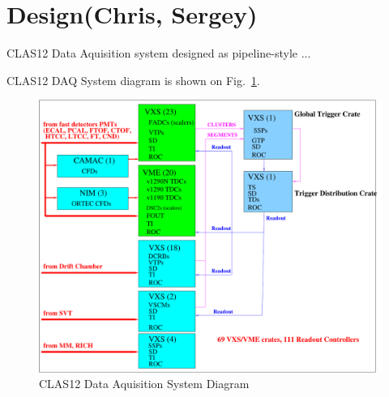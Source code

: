 \section{Design(Chris, Sergey)}

CLAS12 Data Aquisition system designed as pipeline-style ... 

CLAS12 DAQ System diagram is shown on Fig.~\ref{fig:DAQdiagram}.

\begin{figure}[hbt]
	\centering
	\includegraphics[width=1.0\columnwidth,keepaspectratio]{img/CLAS12_HARDWARE_2.pdf}
	\caption{CLAS12 Data Aquisition System Diagram}
	\label{fig:DAQdiagram}
\end{figure}

